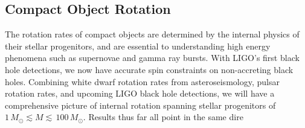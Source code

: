 {\color{orange}

\subsection{Compact Object Rotation}

The rotation rates of compact objects are determined by the internal physics of their stellar progenitors, and are essential to understanding high energy phenomena such as supernovae and gamma ray bursts. With LIGO's first black hole detections, we now have accurate spin constraints on non-accreting black holes. Combining white dwarf rotation rates from asteroseismology, pulsar rotation rates, and upcoming LIGO black hole detections, we will have a comprehensive picture of internal rotation spanning stellar progenitors of $1 \, M_\odot \lesssim M \lesssim \, 100 \, M_\odot$. Results thus far all point in the same dire

}